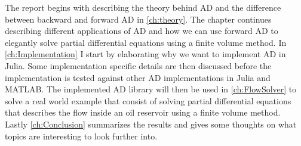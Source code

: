 The report begins with describing the theory behind AD and the difference between backward and forward AD in \autoref{ch:theory}. The chapter continues describing different applications of AD and how we can use forward AD to elegantly solve partial differential equations using a finite volume method. In \autoref{ch:Implementation} I start by elaborating why we want to implement AD in Julia. Some implementation specific details are then discussed before the implementation is tested against other AD implementations in Julia and MATLAB. The implemented AD library will then be used in \autoref{ch:FlowSolver} to solve a real world example that consist of solving partial differential equations that describes the flow inside an oil reservoir using a finite volume method. Lastly \autoref{ch:Conclusion} summarizes the results and gives some thoughts on what topics are interesting to look further into.



\listoftodos
